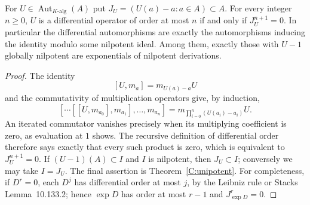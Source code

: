 \begin{theorem}
\label{C:differential}
For $U\in\operatorname{Aut}_{K\text{-alg}}(A)$ put
$J_U=(U(a)-a:a\in A)\subset A$.
For every integer $n\geq0$, $U$ is a differential operator of order at most $n$ if and only if $J_U^{n+1}=0$. In particular the differential automorphisms are exactly the automorphisms inducing the identity modulo some nilpotent ideal. Among them, exactly those with $U-1$ globally nilpotent are exponentials of nilpotent derivations.
\end{theorem}
\begin{proof}
The identity
\[
[U,m_a]=m_{U(a)-a}U
\]
and the commutativity of multiplication operators give, by induction,
\[
[\cdots[[U,m_{a_0}],m_{a_1}],\ldots,m_{a_n}]
 =m_{\prod_{i=0}^n(U(a_i)-a_i)}U.
\]
An iterated commutator vanishes precisely when its multiplying coefficient is zero, as evaluation at $1$ shows. The recursive definition of differential order therefore says exactly that every such product is zero, which is equivalent to $J_U^{n+1}=0$. If $(U-1)(A)\subset I$ and $I$ is nilpotent, then $J_U\subset I$; conversely we may take $I=J_U$. The final assertion is Theorem~\ref{C:unipotent}. For completeness, if $D^r=0$, each $D^j$ has differential order at most $j$, by the Leibniz rule or Stacks Lemma~10.133.2; hence $\exp D$ has order at most $r-1$ and $J_{\exp D}^{r}=0$.
\end{proof}

